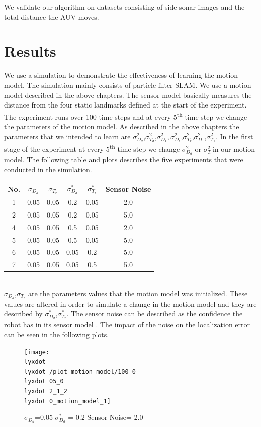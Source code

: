 \documentclass[12pt]{dalcsthesis}
\begin{document}
We validate our algorithm on datasets consisting of side sonar images
and the total distance the AUV moves. 

\section{Results}
We use a simulation to demonstrate the effectiveness of learning the
motion model. The simulation mainly consists of particle filter SLAM.
We use a motion model described in the above chapters. The sensor
model basically measures the distance from the four static landmarks
defined at the start of the experiment. The experiment runs over 100
time steps and at every 5\textsuperscript{th} time step we change
the parameters of the motion model. As described in the above chapters
the parameters that we intended to learn are $\sigma_{D_{d}}^{2}$,$\sigma_{T_{d}}^{2}$,$\sigma_{D_{1}}^{2},\sigma_{D_{r}}^{2}$,$\sigma_{T_{r}}^{2}$,$\sigma_{D_{1}}^{2}$,$\sigma_{T_{1}}^{2}$.
In the first stage of the experiment at every 5\textsuperscript{th }time step
we change $\sigma_{D_{d}}^{2}$ or $\sigma_{T_{r}}^{2}$in our motion
model. The following table and plots describes the five experiments
that were conducted in the simulation.

\begin{tabular}{|c|c|c|c|c|c|}
\hline 
No. & $\sigma_{D_{d}}$ & $\sigma_{T_{r}}$ & $\sigma_{D_{d}}^{*}$ & $\sigma_{T_{r}}^{*}$ & Sensor Noise\tabularnewline
\hline 
\hline 
1 & 0.05 & 0.05 & 0.2 & 0.05 & 2.0\tabularnewline
\hline 
2 & 0.05 & 0.05 & 0.2 & 0.05 & 5.0\tabularnewline
\hline 
4 & 0.05 & 0.05 & 0.5 & 0.05 & 2.0\tabularnewline
\hline 
5 & 0.05 & 0.05 & 0.5 & 0.05 & 5.0\tabularnewline
\hline 
6 & 0.05 & 0.05 & 0.05 & 0.2 & 5.0\tabularnewline
\hline 
7 & 0.05 & 0.05 & 0.05 & 0.5 & 5.0\tabularnewline
\hline 
\end{tabular}
\\

$\sigma_{D_{d}}$,$\sigma_{T_{r}}$ are the parameters values that
the motion model was initialized. These values are altered in order
to simulate a change in the motion model and they are described by
$\sigma_{D_{d}}^{*}$,$\sigma_{T_{r}}^{*}$. The sensor noise can
be described as the confidence the robot has in its sensor model .
The impact of the noise on the localization error can be seen in the
following plots.

\begin{figure}
\caption{$\sigma_{D_{d}}$=0.05 $\sigma_{D_{d}}^{*}$ = 0.2 Sensor Noise= 2.0}


\texttt{[image: \\lyxdot \\lyxdot /plot\_motion\_model/100\_0\\lyxdot 05\_0\\lyxdot 2\_1\_2\\lyxdot 0\_motion\_model\_1]}
\end{figure}
\end{document}
